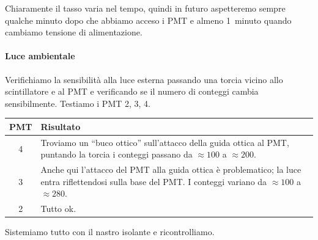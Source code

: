 \documentclass[a4paper]{article}
\begin{document}
Chiaramente il tasso varia nel tempo, quindi in futuro aspetteremo sempre qualche minuto dopo che abbiamo acceso i PMT e almeno 1~minuto quando cambiamo tensione di alimentazione.

\paragraph{Luce ambientale}

Verifichiamo la sensibilità alla luce esterna passando una torcia vicino allo scintillatore e al PMT e verificando se il numero di conteggi cambia sensibilmente.
Testiamo i PMT 2, 3, 4.
\begin{center}
\begin{tabular}{c|p{50ex}}
	PMT & Risultato \\
	\hline
	4 &
	Troviamo un ``buco ottico'' sull'attacco della guida ottica al PMT,
	puntando la torcia i conteggi passano da $\approx 100$ a $\approx 200$. \\
	3 &
	Anche qui l'attacco del PMT alla guida ottica è problematico;
	la luce entra riflettendosi sulla base del PMT.
	I conteggi variano da $\approx 100$ a $\approx 280$.\\
	2 &
	Tutto ok.
\end{tabular}
\end{center}
Sistemiamo tutto con il nastro isolante e ricontrolliamo.
\end{document}
